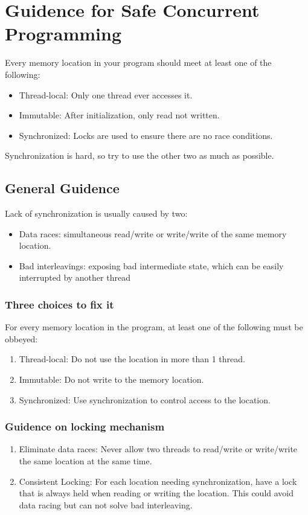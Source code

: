 \documentclass[letterpaper,12pt]{article}
\begin{document}
\section{Guidence for Safe Concurrent Programming}
Every memory location in your program should meet at least one of the following:\begin{itemize}
      \item Thread-local: Only one thread ever accesses it.
      \item Immutable: After initialization, only read not written. 
      \item Synchronized: Locks are used to ensure there are no race conditions.
\end{itemize}
Synchronization is hard, so try to use the other two as much as possible. 

\subsection{General Guidence}
Lack of synchronization is usually caused by two:\begin{itemize}
      \item Data races: simultaneous read/write or write/write of the same memory location. 
      \item Bad interleavings: exposing bad intermediate state, which can be easily interrupted by another thread
\end{itemize}
\subsubsection{Three choices to fix it}
For every memory location in the program, at least one of the following must be obbeyed:\begin{enumerate}
      \item Thread-local: Do not use the location in more than 1 thread.
      \item Immutable: Do not write to the memory location.
      \item Synchronized: Use synchronization to control access to the location.
\end{enumerate}
\subsubsection{Guidence on locking mechanism}
\begin{enumerate}
      \item Eliminate data races: Never allow two threads to read/write or write/write the same location at the same time.
      \item Consistent Locking: For each location needing synchronization, have a lock that is always held when reading or writing the location. This could avoid data racing but can not solve bad interleaving. 
\end{enumerate}
\end{document}
